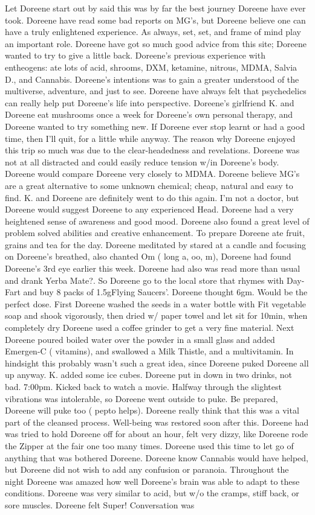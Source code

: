 \documentclass[12pt]{book}
\begin{document}
Let Doreene start out by said this was by far the best journey Doreene have ever took. Doreene have read some bad reports on MG's, but Doreene believe one can have a truly enlightened experience. As always, set, set, and frame of mind play an important role. Doreene have got so much good advice from this site; Doreene wanted to try to give a little back. Doreene's previous experience with entheogens: ate lots of acid, shrooms, DXM, ketamine, nitrous, MDMA, Salvia D., and Cannabis. Doreene's intentions was to gain a greater understood of the multiverse, adventure, and just to see. Doreene have always felt that psychedelics can really help put Doreene's life into perspective. Doreene's girlfriend K. and Doreene eat mushrooms once a week for Doreene's own personal therapy, and Doreene wanted to try something new. If Doreene ever stop learnt or had a good time, then I'll quit, for a little while anyway. The reason why Doreene enjoyed this trip so much was due to the clear-headedness and revelations. Doreene was not at all distracted and could easily reduce tension w/in Doreene's body. Doreene would compare Doreene very closely to MDMA. Doreene believe MG's are a great alternative to some unknown chemical; cheap, natural and easy to find. K. and Doreene are definitely went to do this again. I'm not a doctor, but Doreene would suggest Doreene to any experienced Head. Doreene had a very heightened sense of awareness and good mood. Doreene also found a great level of problem solved abilities and creative enhancement. To prepare Doreene ate fruit, grains and tea for the day. Doreene meditated by stared at a candle and focusing on Doreene's breathed, also chanted Om ( long a, oo, m), Doreene had found Doreene's 3rd eye earlier this week. Doreene had also was read more than usual and drank Yerba Mate?. So Doreene go to the local store that rhymes with Day-Fart and buy 8 packs of 1.5gFlying Saucers'. Doreene thought 6gm. Would be the perfect dose. First Doreene washed the seeds in a water bottle with Fit vegetable soap and shook vigorously, then dried w/ paper towel and let sit for 10min, when completely dry Doreene used a coffee grinder to get a very fine material. Next Doreene poured boiled water over the powder in a small glass and added Emergen-C ( vitamins), and swallowed a Milk Thistle, and a multivitamin. In hindsight this probably wasn't such a great idea, since Doreene puked Doreene all up anyway. K. added some ice cubes. Doreene put in down in two drinks, not bad. 7:00pm. Kicked back to watch a movie. Halfway through the slightest vibrations was intolerable, so Doreene went outside to puke. Be prepared, Doreene will puke too ( pepto helps). Doreene really think that this was a vital part of the cleansed process. Well-being was restored soon after this. Doreene had was tried to hold Doreene off for about an hour, felt very dizzy, like Doreene rode the Zipper at the fair one too many times. Doreene used this time to let go of anything that was bothered Doreene. Doreene know Cannabis would have helped, but Doreene did not wish to add any confusion or paranoia. Throughout the night Doreene was amazed how well Doreene's brain was able to adapt to these conditions. Doreene was very similar to acid, but w/o the cramps, stiff back, or sore muscles. Doreene felt Super! Conversation was 
\end{document}
